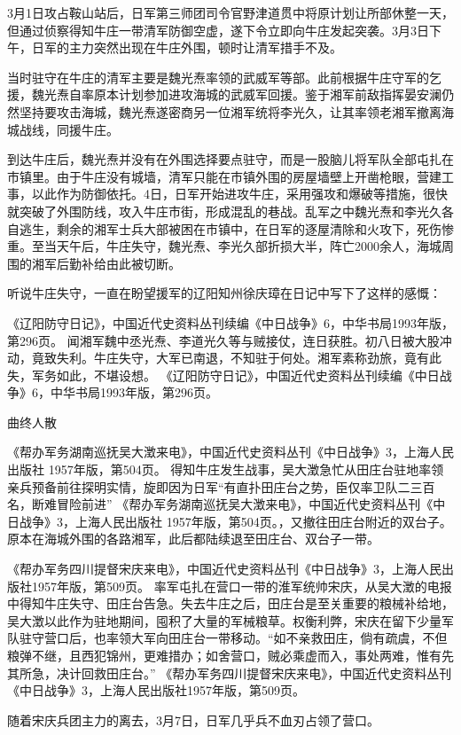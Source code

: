 \documentclass[12pt,UTF8]{ctexbook}
\begin{document}
3月1日攻占鞍山站后，日军第三师团司令官野津道贯中将原计划让所部休整一天，但通过侦察得知牛庄一带清军防御空虚，遂下令立即向牛庄发起突袭。3月3日下午，日军的主力突然出现在牛庄外围，顿时让清军措手不及。

当时驻守在牛庄的清军主要是魏光焘率领的武威军等部。此前根据牛庄守军的乞援，魏光焘自率原本计划参加进攻海城的武威军回援。鉴于湘军前敌指挥晏安澜仍然坚持要攻击海城，魏光焘遂密商另一位湘军统将李光久，让其率领老湘军撤离海城战线，同援牛庄。

到达牛庄后，魏光焘并没有在外围选择要点驻守，而是一股脑儿将军队全部屯扎在市镇里。由于牛庄没有城墙，清军只能在市镇外围的房屋墙壁上开凿枪眼，营建工事，以此作为防御依托。4日，日军开始进攻牛庄，采用强攻和爆破等措施，很快就突破了外围防线，攻入牛庄市街，形成混乱的巷战。乱军之中魏光焘和李光久各自逃生，剩余的湘军士兵大部被困在市镇中，在日军的逐屋清除和火攻下，死伤惨重。至当天午后，牛庄失守，魏光焘、李光久部折损大半，阵亡2000余人，海城周围的湘军后勤补给由此被切断。

听说牛庄失守，一直在盼望援军的辽阳知州徐庆璋在日记中写下了这样的感慨：

《辽阳防守日记》，中国近代史资料丛刊续编《中日战争》6，中华书局1993年版，第296页。
闻湘军魏中丞光焘、李道光久等与贼接仗，连日获胜。初八日被大股冲动，竟致失利。牛庄失守，大军已南退，不知驻于何处。湘军素称劲旅，竟有此失，军务如此，不堪设想。 《辽阳防守日记》，中国近代史资料丛刊续编《中日战争》6，中华书局1993年版，第296页。

曲终人散

《帮办军务湖南巡抚吴大澂来电》，中国近代史资料丛刊《中日战争》3，上海人民出版社 1957年版，第504页。
得知牛庄发生战事，吴大澂急忙从田庄台驻地率领亲兵预备前往探明实情，旋即因为日军“有直扑田庄台之势，臣仅率卫队二三百名，断难冒险前进” 《帮办军务湖南巡抚吴大澂来电》，中国近代史资料丛刊《中日战争》3，上海人民出版社 1957年版，第504页。，又撤往田庄台附近的双台子。原本在海城外围的各路湘军，此后都陆续退至田庄台、双台子一带。

《帮办军务四川提督宋庆来电》，中国近代史资料丛刊《中日战争》3，上海人民出版社1957年版，第509页。
率军屯扎在营口一带的淮军统帅宋庆，从吴大澂的电报中得知牛庄失守、田庄台告急。失去牛庄之后，田庄台是至关重要的粮械补给地，吴大澂以此作为驻地期间，囤积了大量的军械粮草。权衡利弊，宋庆在留下少量军队驻守营口后，也率领大军向田庄台一带移动。“如不亲救田庄，倘有疏虞，不但粮弹不继，且西犯锦州，更难措办；如舍营口，贼必乘虚而入，事处两难，惟有先其所急，决计回救田庄台。” 《帮办军务四川提督宋庆来电》，中国近代史资料丛刊《中日战争》3，上海人民出版社1957年版，第509页。

随着宋庆兵团主力的离去，3月7日，日军几乎兵不血刃占领了营口。
\end{document}
